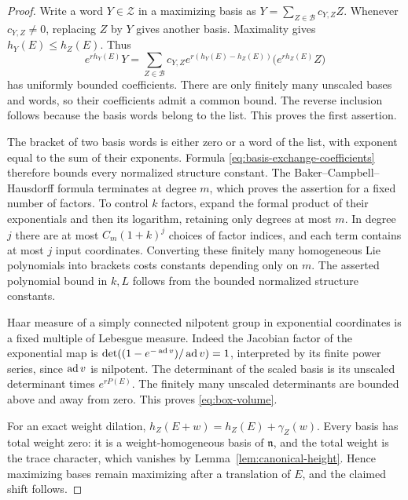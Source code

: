 \begin{proof}
Write a word $Y\in\mathcal Z$ in a maximizing basis as
$Y=\sum_{Z\in\mathcal B}c_{Y,Z}Z$. Whenever $c_{Y,Z}\ne0$, replacing
$Z$ by $Y$ gives another basis. Maximality gives $h_Y(E)\le h_Z(E)$.
Thus
\begin{equation}\label{eq:basis-exchange-coefficients}
 e^{rh_Y(E)}Y=
 \sum_{Z\in\mathcal B}c_{Y,Z}e^{r(h_Y(E)-h_Z(E))}
 \big(e^{rh_Z(E)}Z\big)
\end{equation}
has uniformly bounded coefficients. There are only finitely many
unscaled bases and words, so their coefficients admit a common bound.
The reverse inclusion follows because the basis words belong to the
list. This proves the first assertion.

The bracket of two basis words is either zero or a word of the list,
with exponent equal to the sum of their exponents. Formula
\eqref{eq:basis-exchange-coefficients} therefore bounds every normalized
structure constant. The Baker--Campbell--Hausdorff formula terminates
at degree $m$, which proves the assertion for a fixed number of
factors. To control $k$ factors, expand the formal product of their
exponentials and then its logarithm, retaining only degrees at most
$m$. In degree $j$ there are at most $C_m(1+k)^j$ choices of factor
indices, and each term contains at most $j$ input coordinates.
Converting these finitely many homogeneous Lie polynomials into
brackets costs constants depending only on $m$. The asserted polynomial
bound in $k,L$ follows from the bounded normalized structure constants.

Haar measure of a simply connected nilpotent group in exponential
coordinates is a fixed multiple of Lebesgue measure. Indeed the
Jacobian factor of the exponential map is
$\det((1-e^{-\operatorname{ad} v})/\operatorname{ad} v)=1$, interpreted by its finite power
series, since $\operatorname{ad} v$ is nilpotent. The determinant of the scaled basis
is its unscaled determinant times $e^{rP(E)}$. The finitely many
unscaled determinants are bounded above and away from zero. This proves
\eqref{eq:box-volume}.

For an exact weight dilation,
$h_Z(E+w)=h_Z(E)+\gamma_Z(w)$. Every basis has total weight zero:
it is a weight-homogeneous basis of $\mathfrak n$, and the total
weight is the trace character, which vanishes by
Lemma~\ref{lem:canonical-height}. Hence maximizing bases remain maximizing
after a translation of $E$, and the claimed shift follows.


\end{proof}
